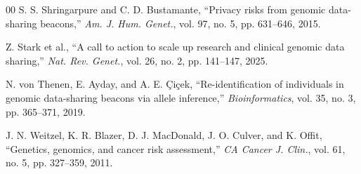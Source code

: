 \documentclass[conference]{IEEEtran}
\begin{document}
\begin{thebibliography}{00}
S. S. Shringarpure and C. D. Bustamante, ``Privacy risks from genomic
data-sharing beacons,'' \textit{Am. J. Hum. Genet.}, vol. 97, no. 5,
pp. 631--646, 2015.

Z. Stark et al., ``A call to action to scale up research and clinical genomic
data sharing,'' \textit{Nat. Rev. Genet.}, vol. 26, no. 2, pp. 141--147, 2025.

N. von Thenen, E. Ayday, and A. E. \c{C}i\c{c}ek, ``Re-identification of
individuals in genomic data-sharing beacons via allele inference,''
\textit{Bioinformatics}, vol. 35, no. 3, pp. 365--371, 2019.

J. N. Weitzel, K. R. Blazer, D. J. MacDonald, J. O. Culver, and K. Offit,
``Genetics, genomics, and cancer risk assessment,'' \textit{CA Cancer J.
Clin.}, vol. 61, no. 5, pp. 327--359, 2011.

\end{thebibliography}
\end{document}
